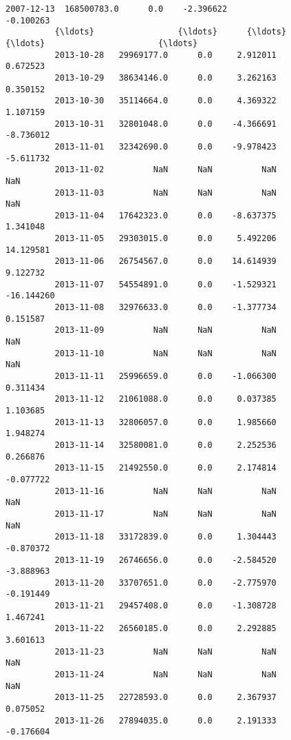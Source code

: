 \documentclass[11pt]{article}
\begin{document}
\begin{Verbatim}[commandchars=\\\{\}]
          2007-12-13  168500783.0      0.0    -2.396622                 -0.100263   
          {\ldots}                 {\ldots}      {\ldots}          {\ldots}                       {\ldots}   
          2013-10-28   29969177.0      0.0     2.912011                  0.672523   
          2013-10-29   38634146.0      0.0     3.262163                  0.350152   
          2013-10-30   35114664.0      0.0     4.369322                  1.107159   
          2013-10-31   32801048.0      0.0    -4.366691                 -8.736012   
          2013-11-01   32342690.0      0.0    -9.978423                 -5.611732   
          2013-11-02          NaN      NaN          NaN                       NaN   
          2013-11-03          NaN      NaN          NaN                       NaN   
          2013-11-04   17642323.0      0.0    -8.637375                  1.341048   
          2013-11-05   29303015.0      0.0     5.492206                 14.129581   
          2013-11-06   26754567.0      0.0    14.614939                  9.122732   
          2013-11-07   54554891.0      0.0    -1.529321                -16.144260   
          2013-11-08   32976633.0      0.0    -1.377734                  0.151587   
          2013-11-09          NaN      NaN          NaN                       NaN   
          2013-11-10          NaN      NaN          NaN                       NaN   
          2013-11-11   25996659.0      0.0    -1.066300                  0.311434   
          2013-11-12   21061088.0      0.0     0.037385                  1.103685   
          2013-11-13   32806057.0      0.0     1.985660                  1.948274   
          2013-11-14   32580081.0      0.0     2.252536                  0.266876   
          2013-11-15   21492550.0      0.0     2.174814                 -0.077722   
          2013-11-16          NaN      NaN          NaN                       NaN   
          2013-11-17          NaN      NaN          NaN                       NaN   
          2013-11-18   33172839.0      0.0     1.304443                 -0.870372   
          2013-11-19   26746656.0      0.0    -2.584520                 -3.888963   
          2013-11-20   33707651.0      0.0    -2.775970                 -0.191449   
          2013-11-21   29457408.0      0.0    -1.308728                  1.467241   
          2013-11-22   26560185.0      0.0     2.292885                  3.601613   
          2013-11-23          NaN      NaN          NaN                       NaN   
          2013-11-24          NaN      NaN          NaN                       NaN   
          2013-11-25   22728593.0      0.0     2.367937                  0.075052   
          2013-11-26   27894035.0      0.0     2.191333                 -0.176604   
          

\end{Verbatim}
\end{document}
